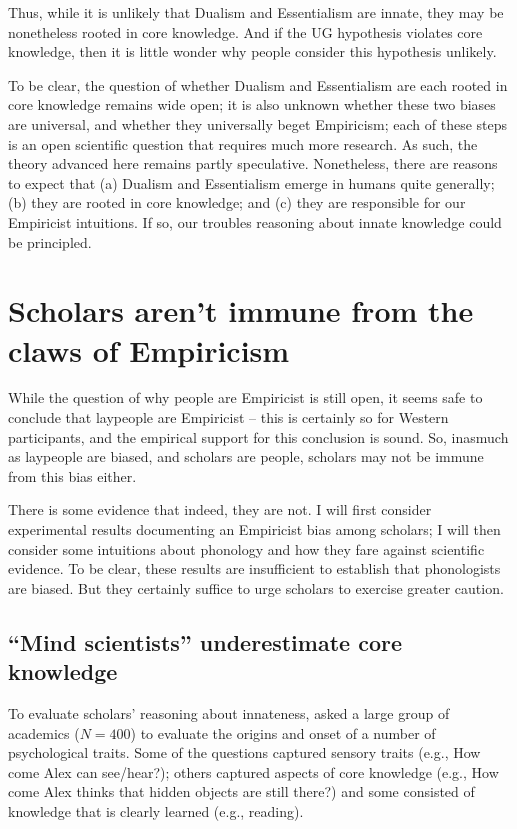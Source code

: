 \documentclass[output=paper,colorlinks,citecolor=brown
]{langscibook}
\begin{document}
Thus, while it is unlikely that Dualism and Essentialism are innate, they may be nonetheless rooted in core knowledge. And if the UG hypothesis violates core knowledge, then it is little wonder why people consider this hypothesis unlikely. 

To be clear, the question of whether Dualism and Essentialism are each rooted in core knowledge remains wide open; it is also unknown whether these two biases are universal, and whether they universally beget Empiricism; each of these steps is an open scientific question that requires much more research. As such, the theory advanced here remains partly speculative. Nonetheless, there are reasons to expect that (a) Dualism and Essentialism emerge in humans quite generally; (b) they are rooted in core knowledge; and (c) they are responsible for our Empiricist intuitions. If so, our troubles reasoning about innate knowledge could be principled.

\section{Scholars aren’t immune from the claws of Empiricism}

While the question of why people are Empiricist is still open, it seems safe to conclude that laypeople are Empiricist -- this is certainly so for Western participants, and the empirical support for this conclusion is sound. So, inasmuch as laypeople are biased, and scholars are people, scholars may not be immune from this bias either. 

There is some evidence that indeed, they are not. I will first consider experimental results documenting an Empiricist bias among scholars; I will then consider some intuitions about phonology and how they fare against scientific evidence. To be clear, these results are insufficient to establish that phonologists are biased. But they certainly suffice to urge scholars to exercise greater caution.

\subsection{``Mind scientists'' underestimate core knowledge}
\begin{sloppypar}
To evaluate scholars’ reasoning about innateness, \citet{wang2019empiricism} asked a large group of academics ($N=400$) to evaluate the origins and onset of a number of psychological traits. Some of the questions captured sensory traits (e.g., How come Alex can see/hear?); others captured aspects of core knowledge (e.g., How come Alex thinks that hidden objects are still there?) and some consisted of knowledge that is clearly learned (e.g., reading). 
\end{sloppypar}
\end{document}

